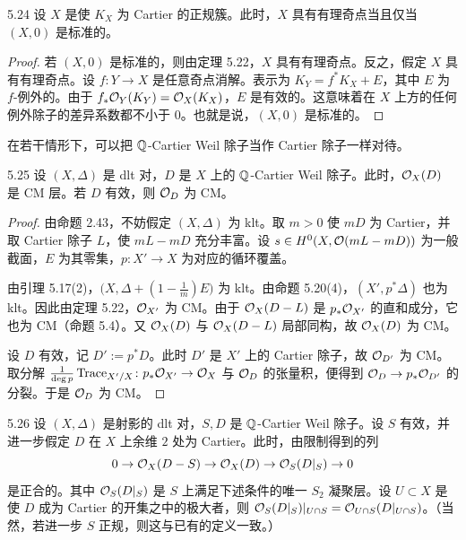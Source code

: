 \begin{corollaryp}{5.24}
设 $X$ 是使 $K_X$ 为 Cartier 的正规簇。此时，$X$ 具有有理奇点当且仅当 $(X,0)$ 是标准的。
\end{corollaryp}

\begin{proof}
若 $(X,0)$ 是标准的，则由定理 5.22，$X$ 具有有理奇点。反之，假定 $X$ 具有有理奇点。设 $f\colon Y\to X$ 是任意奇点消解。表示为 $K_Y=f^*K_X+E$，其中 $E$ 为 $f$-例外的。由于 $f_*\mathcal{O}_Y(K_Y)=\mathcal{O}_X(K_X)$，$E$ 是有效的。这意味着在 $X$ 上方的任何例外除子的差异系数都不小于 $0$。也就是说，$(X,0)$ 是标准的。
\end{proof}

在若干情形下，可以把 $\mathbb{Q}$-Cartier Weil 除子当作 Cartier 除子一样对待。

\begin{corollaryp}{5.25}
设 $(X,\Delta)$ 是 dlt 对，$D$ 是 $X$ 上的 $\mathbb{Q}$-Cartier Weil 除子。此时，$\mathcal{O}_X(D)$ 是 CM 层。若 $D$ 有效，则 $\mathcal{O}_D$ 为 CM。
\end{corollaryp}

\begin{proof}
由命题 2.43，不妨假定 $(X,\Delta)$ 为 klt。取 $m>0$ 使 $mD$ 为 Cartier，并取 Cartier 除子 $L$，使 $mL-mD$ 充分丰富。设 $s\in H^0(X,\mathcal{O}(mL-mD))$ 为一般截面，$E$ 为其零集，$p\colon X'\to X$ 为对应的循环覆盖。

由引理 5.17(2)，$\bigl(X,\Delta+(1-\frac{1}{m})E\bigr)$ 为 klt。由命题 5.20(4)，$(X',p^*\Delta)$ 也为 klt。因此由定理 5.22，$\mathcal{O}_{X'}$ 为 CM。由于 $\mathcal{O}_X(D-L)$ 是 $p_*\mathcal{O}_{X'}$ 的直和成分，它也为 CM（命题 5.4）。又 $\mathcal{O}_X(D)$ 与 $\mathcal{O}_X(D-L)$ 局部同构，故 $\mathcal{O}_X(D)$ 为 CM。

设 $D$ 有效，记 $D':=p^*D$。此时 $D'$ 是 $X'$ 上的 Cartier 除子，故 $\mathcal{O}_{D'}$ 为 CM。取分解 $\frac{1}{\deg p}\operatorname{Trace}_{X'/X}\colon p_*\mathcal{O}_{X'}\to\mathcal{O}_X$ 与 $\mathcal{O}_D$ 的张量积，便得到 $\mathcal{O}_D\to p_*\mathcal{O}_{D'}$ 的分裂。于是 $\mathcal{O}_D$ 为 CM。
\end{proof}


\begin{propositionp}{5.26}
设 $(X,\Delta)$ 是射影的 dlt 对，$S,D$ 是 $\mathbb{Q}$-Cartier Weil 除子。设 $S$ 有效，并进一步假定 $D$ 在 $X$ 上余维 $2$ 处为 Cartier。此时，由限制得到的列
\[
0\to\mathcal{O}_X(D-S)\to\mathcal{O}_X(D)\to\mathcal{O}_S(D|_S)\to0
\]
是正合的。其中 $\mathcal{O}_S(D|_S)$ 是 $S$ 上满足下述条件的唯一 $S_2$ 凝聚层。设 $U\subset X$ 是使 $D$ 成为 Cartier 的开集之中的极大者，则 $\mathcal{O}_S(D|_S)|_{U\cap S}=\mathcal{O}_{U\cap S}(D|_{U\cap S})$。（当然，若进一步 $S$ 正规，则这与已有的定义一致。）
\end{propositionp}

